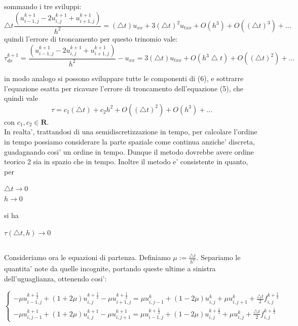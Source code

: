 \documentclass[]{article}
\begin{document}
sommando i tre sviluppi:
\begin{equation}
\bigtriangleup t\frac{(u^{k+1}_{i-1,j} -2u^{k+1}_{i,j} + u^{k+1}_{i+1,j})}{h^2}  = (\bigtriangleup t)u_{xx} + 3(\bigtriangleup t)^2 u_{txx} + O(h^3) + O((\bigtriangleup t)^3) + ...
\end{equation}
quindi l'errore di troncamento per questo trinomio vale:
\begin{equation}
\tau^{k+1}_{dx} = \frac{(u^{k+1}_{i-1,j} -2u^{k+1}_{i,j} + u^{k+1}_{i+1,j})}{h^2}  - u_{xx} = 3(\bigtriangleup t) u_{txx} + O(
h^3 \bigtriangleup t) + O((\bigtriangleup t)^2) + ...
\end{equation}

in modo analogo si possono sviluppare tutte le componenti di (6), e sottrarre l'equazione esatta per ricavare l'errore di troncamento dell'equazione (5), che quindi vale
\begin{equation}
\tau = c_1 (\bigtriangleup t) + c_2 h^2 + O((\bigtriangleup t)^2) + O(h^3) + ...
\end{equation}
con $c_1, c_2 \in \textbf{R}$.\\
In realta', trattandosi di una semidiscretizzazione in tempo, per calcolare l'ordine in tempo possiamo considerare la parte spaziale come continua anziche' discreta, guadagnando cosi' un ordine in tempo. Dunque il metodo dovrebbe avere ordine teorico 2 sia in spazio che in tempo.
Inoltre il metodo e' consistente in quanto, per
\begin{center}
	$\bigtriangleup t \rightarrow 0$\\
	$h \rightarrow 0$
\end{center}
si ha
\begin{center}
	$\tau (\bigtriangleup t, h) \rightarrow 0$
\end{center}

\subsection{}
Consideriamo ora le equazioni di partenza. Definiamo $\mu := \frac{\bigtriangleup t}{h^2}$. Separiamo le quantita' note da quelle incognite, portando queste ultime a sinistra dell'uguaglianza, ottenendo cosi':

\begin{equation}
\begin{cases}
-\mu u^{k+\frac{1}{2}}_{i-1,j} + (1+2\mu)u^{k+\frac{1}{2}}_{i,j} -\mu u^{k+\frac{1}{2}}_{i+1,j} = \mu u^{k}_{i,j-1} + (1-2\mu) u^{k}_{i,j} + \mu u^{k}_{i,j+1} + \frac{\bigtriangleup t}{2} f^{k+\frac{1}{2}}_{i,j}\\ 

-\mu u^{k+1}_{i,j-1} + (1+2\mu)u^{k+1}_{i,j} -\mu u^{k+1}_{i,j+1} = \mu u^{k+\frac{1}{2}}_{i-1,j} + (1-2\mu) u^{k+\frac{1}{2}}_{i,j} + \mu u^{k}_{i,j} + \frac{\bigtriangleup t}{2} f^{k+\frac{1}{2}}_{i,j}

\end{cases}
\end{equation}
\end{document}
